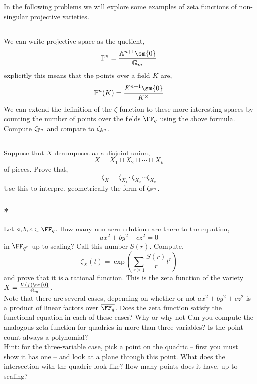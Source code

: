 \documentclass[12pt]{article}
\begin{document}
In the following problems we will explore some examples of zeta functions of non-singular projective varieties. 

\subsection{}

We can write projective space as the quotient,
\[ \P^n = \frac{\A^{n+1} \sm \{ 0 \}}{\Gm} \]
explicitly this means that the points over a field $K$ are,
\[ \P^n(K) = \frac{K^{n+1} \sm \{ 0 \}}{K^\times } \]
We can extend the definition of the $\zeta$-function to these more interesting spaces by counting the number of points over the fields $\FF_q$ using the above formula. Compute $\zeta_{\P^n}$ and compare to $\zeta_{\A^n}$.

\subsection{}

Suppose that $X$ decomposes as a disjoint union,
\[ X = X_1 \sqcup X_2 \sqcup \cdots \sqcup X_k \]
of pieces. Prove that,
\[ \zeta_X = \zeta_{X_1} \cdot \zeta_{X_2} \cdots \zeta_{X_k} \]
Use this to interpret geometrically the form of $\zeta_{\P^n}$.

\subsection{$\ast$}

Let $a,b,c \in \FF_q$. How many non-zero solutions are there to the equation,
\[ a x^2 + b y^2 + c z^2 = 0 \]
in $\FF_{q^r}$ up to scaling? Call this number $S(r)$. Compute,
\[ \zeta_X(t) = \exp{ \left( \sum_{r \ge 1} \frac{S(r)}{r} t^r \right) } \] 
and prove that it is a rational function. This is the zeta function of the variety $X = \frac{V(f) \sm \{ 0 \}}{\Gm}$.
\\
Note that there are several cases, depending on whether or not $a x^2 + b y^2 + c z^2$ is a product of linear factors over $\overline{\FF_q}$. Does the zeta function satisfy the functional equation in each of these cases? Why or why not Can you compute the analogous zeta function for quadrics in more than three variables? Is the point count always a polynomial?
\\
Hint: for the three-variable case, pick a point on the quadric -- first you must show it has one -- and look at a plane through this point. What does the intersection with the quadric look like? How many points does it have, up to scaling?
\end{document}
